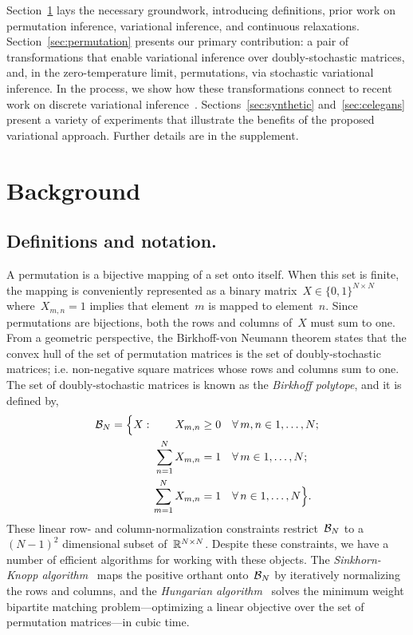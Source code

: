 \documentclass[twoside]{article}
\begin{document}
Section~\ref{sec:background} lays the necessary groundwork,
introducing definitions, prior work on permutation inference,
variational inference, and continuous relaxations.
Section~\ref{sec:permutation} presents our primary contribution: a
pair of transformations that enable variational inference over
doubly-stochastic matrices, and, in the zero-temperature limit,
permutations, via stochastic variational inference.  In the process,
we show how these transformations connect to recent work on discrete
variational inference~\citep{maddison2016concrete,
  jang2016categorical, balog2017lost}.  Sections~\ref{sec:synthetic}
and~\ref{sec:celegans} present a variety of experiments that
illustrate the benefits of the proposed variational approach.
Further details are in the supplement.
  
\section{Background}
\label{sec:background}


\subsection{Definitions and notation.}  A permutation is a bijective
mapping of a set onto itself.  When this set is finite, the mapping is
conveniently represented as a binary
matrix~${X \in \{0,1\}^{N \times N}}$ where~${X_{m,n}=1}$ implies that
element~$m$ is mapped to element~$n$.  Since permutations are
bijections, both the rows and columns of~$X$ must sum to one.  From a
geometric perspective, the Birkhoff-von Neumann theorem states that
the convex hull of the set of permutation matrices is the set of
doubly-stochastic matrices; i.e. non-negative square matrices whose
rows and columns sum to one. The set of doubly-stochastic matrices is
known as the \emph{Birkhoff polytope}, and it is defined by,
\begin{align*}
  \mathcal{B}_N = \Big \{X : \qquad 
           X_{m,n} &\geq 0   & &\forall \, m,n \in 1, \ldots, N; \\
           \sum_{n=1}^N X_{m,n} &= 1  & &\forall \, m \in 1, \ldots, N; \\
           \sum_{m=1}^N X_{m,n} & =1 &  &\forall \, n \in 1, \ldots, N \Big\}.
\end{align*}
These linear row- and column-normalization constraints
restrict~$\mathcal{B}_N$ to a~${(N-1)^2}$ dimensional subset
of~$\mathbb{R}^{N \times N}$.  Despite these constraints, we have a number
of efficient algorithms for working with these objects.  The
\emph{Sinkhorn-Knopp algorithm}~\citep{sinkhorn1967concerning}
maps the positive orthant onto~$\mathcal{B}_N$ by iteratively normalizing
the rows and columns, and the \emph{Hungarian
  algorithm}~\citep{kuhn1955hungarian, munkres1957algorithms} solves
the minimum weight bipartite matching problem---optimizing a linear
objective over the set of permutation matrices---in cubic time.
\end{document}
